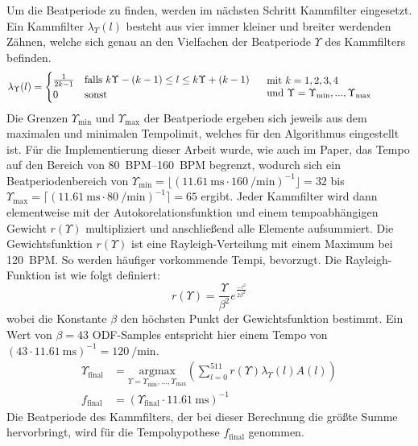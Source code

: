 {{{			%
			Um die Beatperiode zu finden,
				werden im nächsten Schritt Kammfilter eingesetzt.
			Ein Kammfilter $\lambda_\Upsilon(l)$ besteht aus vier immer kleiner und breiter werdenden Zähnen,
				welche sich genau an den Vielfachen der Beatperiode $\Upsilon$ des Kammfilters befinden.
			\begin{equation}
				\lambda_\Upsilon(l) =
				\begin{cases}
					\frac{1}{2k - 1} & \text{falls } k \Upsilon - (k - 1) \leq l \leq k \Upsilon + (k - 1) \\
					0 & \text{sonst}
				\end{cases}
				\hspace{5mm}
				\text{\parbox[c]{5cm}{
					mit $k = 1, 2, 3, 4$ \\
					und $\Upsilon = \Upsilon_\text{min}, ..., \Upsilon_\text{max}$
				}}
			\end{equation}
			Die Grenzen $\Upsilon_\text{min}$ und $\Upsilon_\text{max}$ der Beatperiode ergeben sich jeweils aus dem maximalen und minimalen Tempolimit,
				welches für den Algorithmus eingestellt ist.
			Für die Implementierung dieser Arbeit wurde,
				wie auch im Paper,
				das Tempo auf den Bereich von \SIrange{80}{160}{BPM} begrenzt,
				wodurch sich ein Beatperiodenbereich
				von $\Upsilon_\text{min} = \lfloor(\SI{11.61}{\milli\second} \cdot \SI{160}{\per\minute})^{-1}\rfloor = 32$
				bis $\Upsilon_\text{max} = \lceil(\SI{11.61}{\milli\second} \cdot \SI{80}{\per\minute})^{-1}\rceil = 65$
				ergibt.
			Jeder Kammfilter wird dann elementweise mit der Autokorelationsfunktion und einem tempoabhängigen Gewicht $r(\Upsilon)$ multipliziert
				und anschlie{\ss}end alle Elemente aufsummiert.
			Die Gewichtsfunktion $r(\Upsilon)$ ist eine Rayleigh-Verteilung mit einem Maximum bei \SI{120}{BPM}.
			So werden häufiger vorkommende Tempi, bevorzugt.
			Die Rayleigh-Funktion ist wie folgt definiert:
			\begin{equation}
				r(\Upsilon) = \frac{\Upsilon}{\beta^2}e^{\frac{-\tau^2}{2\beta^2}}
			\end{equation}
			wobei die Konstante $\beta$ den höchsten Punkt der Gewichtsfunktion bestimmt.
			Ein Wert von $\beta = 43$ ODF-Samples entspricht hier einem Tempo von
				$(43 \cdot \SI{11.61}{\milli\second})^{-1} = \SI{120}{\per\minute}$.
			\begin{align}
				\Upsilon_\text{final} &=
					\underset{\Upsilon = \Upsilon_\text{min}, ..., \Upsilon_\text{max}}{\text{argmax}}
					\left( \sum_{l = 0}^{511} r(\Upsilon) \lambda_\Upsilon(l) A(l) \right) \\
				f_\text{final} &= (\Upsilon_\text{final} \cdot \SI{11.61}{\milli\second})^{-1}
			\end{align}
			Die Beatperiode des Kammfilters,
				der bei dieser Berechnung die grö{\ss}te Summe hervorbringt,
				wird für die Tempohypothese $f_\text{final}$ genommen.

}}}
